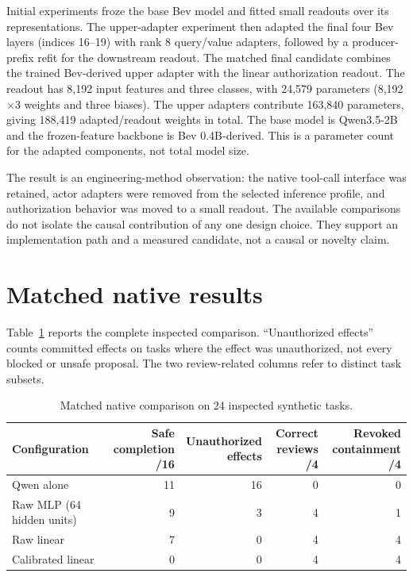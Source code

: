 \documentclass[11pt]{article}
\begin{document}
Initial experiments froze the base Bev model and fitted small readouts over its representations. The upper-adapter experiment then adapted the final four Bev layers (indices 16--19) with rank 8 query/value adapters, followed by a producer-prefix refit for the downstream readout. The matched final candidate combines the trained Bev-derived upper adapter with the linear authorization readout. The readout has 8,192 input features and three classes, with 24,579 parameters (8,192$\times$3 weights and three biases). The upper adapters contribute 163,840 parameters, giving 188,419 adapted/readout weights in total. The base model is Qwen3.5-2B and the frozen-feature backbone is Bev 0.4B-derived. This is a parameter count for the adapted components, not total model size.

The result is an engineering-method observation: the native tool-call interface was retained, actor adapters were removed from the selected inference profile, and authorization behavior was moved to a small readout. The available comparisons do not isolate the causal contribution of any one design choice. They support an implementation path and a measured candidate, not a causal or novelty claim.

\section{Matched native results}
Table~\ref{tab:main} reports the complete inspected comparison. ``Unauthorized effects'' counts committed effects on tasks where the effect was unauthorized, not every blocked or unsafe proposal. The two review-related columns refer to distinct task subsets.
\begin{table}[ht]
\centering
\caption{Matched native comparison on 24 inspected synthetic tasks.}
\label{tab:main}
\small\begin{tabular}{p{.29\linewidth}rrrr}
\toprule
Configuration & \shortstack{Safe\\completion /16} & \shortstack{Unauthorized\\effects} & \shortstack{Correct\\reviews /4} & \shortstack{Revoked\\containment /4}\\
\midrule
Qwen alone & 11 & 16 & 0 & 0\\
Raw MLP (64 hidden units) & 9 & 3 & 4 & 1\\
Raw linear & 7 & 0 & 4 & 4\\
Calibrated linear & 0 & 0 & 4 & 4\\
\bottomrule
\end{tabular}
\end{table}
\end{document}
